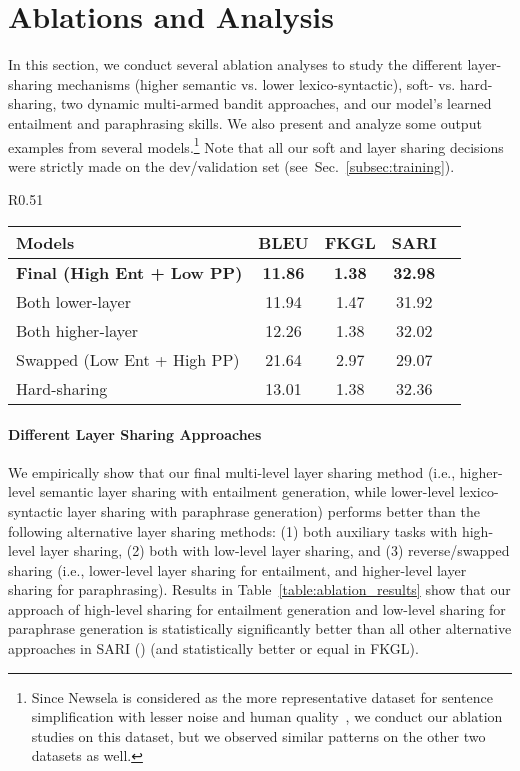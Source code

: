 \documentclass[11pt]{article}
\def\secref#1{Sec.~\ref{#1}}
\begin{document}
\section{Ablations and Analysis}
\label{sec:analysis}

In this section, we conduct several ablation analyses to study the different layer-sharing mechanisms (higher semantic vs. lower lexico-syntactic), soft- vs. hard-sharing, two dynamic multi-armed bandit approaches, and our model's learned entailment and paraphrasing skills. We also present and analyze some output examples from several models.\footnote{Since Newsela is considered as the more representative dataset for sentence simplification with lesser noise and human quality~\cite{xu2015problems,zhang2017dress}, we conduct our ablation studies on this dataset, but we observed similar patterns on the other two datasets as well.} Note that all our soft and layer sharing decisions were strictly made on the dev/validation set (see~\secref{subsec:training}).

\begin{wraptable}[7]{R}{0.51\textwidth}
    \vspace{-5pt}
\begin{small}
\begin{tabular}{|l|c|c|c|c|}
\hline
Models & BLEU & FKGL & SARI\\
\hline
\textbf{Final (High Ent + Low PP)} & \textbf{11.86} & \textbf{1.38} & 
\textbf{32.98} \\
\hline
Both lower-layer & 11.94 & 1.47 & 31.92 \\
Both higher-layer & 12.26 & 1.38 & 32.02 \\
Swapped (Low Ent + High PP) & 21.64 & 2.97 & 29.07 \\
\hline
Hard-sharing & 13.01 & 1.38 & 32.36 \\
\hline
\end{tabular}
\end{small}
\vspace{-12pt}
\caption{Multi-task layer ablation results on Newsela.}
\label{table:ablation_results}
\end{wraptable}

\paragraph{Different Layer Sharing Approaches}
We empirically show that our final multi-level layer sharing method (i.e., higher-level semantic layer sharing with entailment generation, while lower-level lexico-syntactic layer sharing with paraphrase generation) performs better than the following alternative layer sharing methods: (1) both auxiliary tasks with high-level layer sharing, (2) both with low-level layer sharing, and (3) reverse/swapped sharing (i.e., lower-level layer sharing for entailment, and higher-level layer sharing for paraphrasing). Results in Table~\ref{table:ablation_results} show that our approach of high-level sharing for entailment generation and low-level sharing for paraphrase generation is statistically significantly better than all other alternative approaches in SARI () (and statistically better or equal in FKGL).
\end{document}
